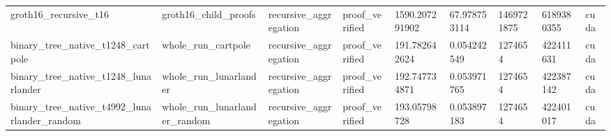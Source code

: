 \begin{table}[t]
\begin{tabular}{lllllllll}
groth16\_recursive\_t16 & groth16\_child\_proofs & recursive\_aggregation & proof\_verified & 1590.207291902 & 67.978753114 & 1469721875 & 6189380355 & cuda &  \\
binary\_tree\_native\_t1248\_cartpole & whole\_run\_cartpole & recursive\_aggregation & proof\_verified & 191.782642624 & 0.054242549 & 1274654 & 422411631 & cuda &  \\
binary\_tree\_native\_t1248\_lunarlander & whole\_run\_lunarlander & recursive\_aggregation & proof\_verified & 192.747734871 & 0.053971765 & 1274654 & 422387142 & cuda &  \\
binary\_tree\_native\_t4992\_lunarlander\_random & whole\_run\_lunarlander\_random & recursive\_aggregation & proof\_verified & 193.05798728 & 0.053897183 & 1274654 & 422401017 & cuda &  \\
\bottomrule
\end{tabular}
\end{table}

